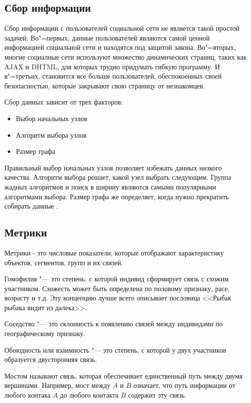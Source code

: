 \subsection{Сбор информации}
Сбор информации с пользователей социальной сети не является такой простой задачей. Во"=первых, данные пользователей являются самой ценной информацией социальной сети и находятся под защитой закона. Во"=вторых, многие социалные сети используют множество динамических страниц, таких как AJAX и DHTML, для которых трудно придумать гибкую программу. И в"=третьих, становится все больше пользователей, обеспокоенных своей безопасностью, которые закрывают свою страницу от незнакомцев. 

Сбор данных зависит от трех факторов:
\begin{itemize}
    \item Выбор начальных узлов
    \item Алгоритм выбора узлов
    \item Размер графа
\end{itemize}
Правильный выбор начальных узлов позволяет избежать данных низкого качества. Алгоритм выбора решает, какой узел выбрать следующим. Группа жадных алгоритмов и поиск в ширину являются самыми популярными алгоритмами выбора. Размер графа же определяет, когда нужно прекратить собирать данные
\cite{CrawlingONS}.

\subsection{Метрики}
Метрики - это числовые показатели, которые отображают характеристику объектов, сегментов, групп и их связей. 

Гомофилия "--- это степень, с которой индивид сформирует связь с схожим участником. Схожесть может быть определена по половому признаку, расе, возрасту и т.д. Эту концепцию лучше всего описывает пословица <<Рыбак рыбака видит из далека>>.

Соседство "--- это склонность к появлению связей между индивидами по географическому признаку.

Обоюдность или взаимность "--- это степень, с которой у двух участников образуется двусторонняя связь\cite{kadushin2012understanding}.

Мостом называют связь, которая обеспечивает единственный путь между двумя вершинами. Например, мост между $A$ и $B$ означает, что путь информации от любого контака $A$ до любого контакта $B$ содержит эту связь\cite{Granovetter}.

